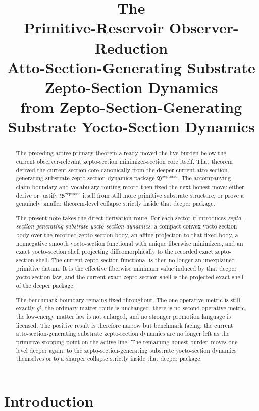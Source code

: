 \documentclass[11pt]{article}
\title{\textbf{The \TheoryName{}}\\[0.4em]
\large Primitive-Reservoir Observer-Reduction\\
\large Atto-Section-Generating Substrate Zepto-Section Dynamics\\
\large from Zepto-Section-Generating Substrate Yocto-Section Dynamics}
\author{}
\date{}
\newcommand{\CompletedMetric}{g^{\sharp}}
\newcommand{\ZeptoSectionPackage}{\mathfrak B^{\mathrm{zeptosec}}}
\begin{document}
\maketitle

\begin{abstract}
The preceding active-primary theorem already moved the live burden below the current observer-relevant zepto-section minimizer-section core itself. That theorem derived the current section core canonically from the deeper current atto-section-generating substrate zepto-section dynamics package \(\ZeptoSectionPackage\). The accompanying claim-boundary and vocabulary routing record then fixed the next honest move: either derive or justify \(\ZeptoSectionPackage\) itself from still more primitive substrate structure, or prove a genuinely smaller theorem-level collapse strictly inside that deeper package.

The present note takes the direct derivation route. For each sector it introduces \emph{zepto-section-generating substrate yocto-section dynamics}: a compact convex yocto-section body over the recorded zepto-section body, an affine projection to that fixed body, a nonnegative smooth yocto-section functional with unique fiberwise minimizers, and an exact yocto-section shell projecting diffeomorphically to the recorded exact zepto-section shell. The current zepto-section functional is then no longer an unexplained primitive datum. It is the effective fiberwise minimum value induced by that deeper yocto-section law, and the current exact zepto-section shell is the projected exact shell of the deeper package.

The benchmark boundary remains fixed throughout. The one operative metric is still exactly \(\CompletedMetric\), the ordinary matter route is unchanged, there is no second operative metric, the low-energy matter law is not enlarged, and no stronger promotion language is licensed. The positive result is therefore narrow but benchmark facing: the current atto-section-generating substrate zepto-section dynamics are no longer left as the primitive stopping point on the active line. The remaining honest burden moves one level deeper again, to the zepto-section-generating substrate yocto-section dynamics themselves or to a sharper collapse strictly inside that deeper package.
\end{abstract}

\section{Introduction}
\end{document}
